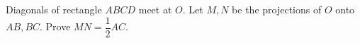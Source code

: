 Diagonals of rectangle $ABCD$ meet at $O$. Let $M,N$ be the projections of $O$ onto $AB,BC$. Prove $MN=\dfrac{1}{2}AC$.
